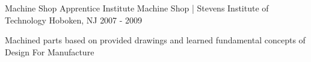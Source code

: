 \begin{cventries}

  \cventry
    {Machine Shop Apprentice} %
    {Institute Machine Shop | Stevens Institute of Technology} %
    {Hoboken, NJ} %
    {2007 - 2009} %
    {%
      \begin{cvitems} %
        \item {Machined parts based on provided drawings and learned fundamental concepts of Design For Manufacture}
      \end{cvitems}
    }

\end{cventries}
